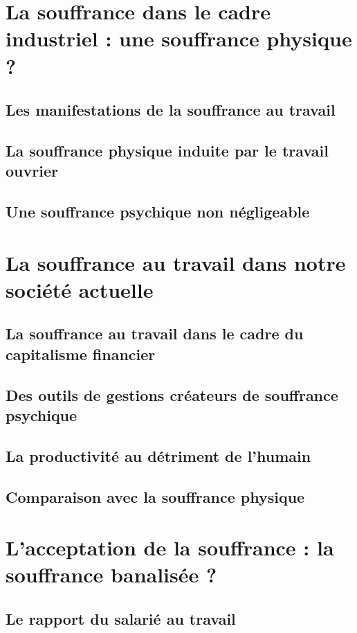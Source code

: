 \documentclass{report}
\begin{document}
\chapter{La souffrance dans le cadre industriel : une souffrance physique ?}
	\section{Les manifestations de la souffrance au travail}

	\section{La souffrance physique induite par le travail ouvrier}

	\section{Une souffrance psychique non négligeable}

\chapter{La souffrance au travail dans notre société actuelle}
	\section{La souffrance au travail dans le cadre du capitalisme financier}

	\section{Des outils de gestions créateurs de souffrance psychique}

	\section{La productivité au détriment de l'humain}

	\section{Comparaison avec la souffrance physique}

\chapter{L’acceptation de la souffrance : la souffrance banalisée ?}
	\section{Le rapport du salarié au travail}
\end{document}
